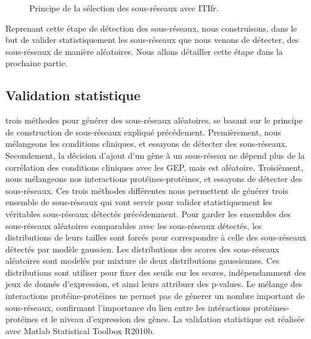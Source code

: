 			\begin{figure}
				\begin{center}
					\def\svgwidth{\columnwidth}
					\caption{Principe de la sélection des sous-réseaux avec \acl{ITIfr}.}
					\label{fig:Algorithme}
				\end{center}
			\end{figure}
			
			Reprenant cette étape de détection des sous-réseaux, nous construisons, dans le but de valider statistiquement les sous-réseaux que nous venons de détecter, des sous-réseaux de manière aléatoires.
			Nous allons détailler cette étape dans la prochaine partie.

		\subsection{\textcolor{green!60!black}{Validation statistique}}
			 trois méthodes pour générer des sous-réseaux aléatoires, se basant sur le principe de construction de sous-réseaux expliqué précédement.
			Premièrement, nous mélangeons les conditions cliniques, et essayons de détecter des sous-réseaux.
			Secondement, la décision d'ajout d'un gène à un sous-réseau ne dépend plus de la corrélation des conditions cliniques avec les \acs{GEP}, mais est aléatoire.
			Troisièment, nous mélangeons nos interactions protéines-protéines, et essayons de détecter des sous-réseaux.
			Ces trois méthodes différentes nous permettent de générer trois ensemble de sous-réseaux qui vont servir pour valider statistiquement les véritables sous-réseaux détectés précédemment.
			Pour garder les ensembles des sous-réseaux aléatoires comparables avec les sous-réseaux détectés, les distributions de leurs tailles sont forcés pour correspondre à celle des sous-réseaux détectés par modèle gaussien.
			Les distributions des scores des sous-réseaux aléatoires sont modelés par mixture de deux distributions gaussiennes.
			Ces distributions sont utiliser pour fixer des seuils sur les scores, indépendamment des jeux de donnés d'expression, et ainsi leurs attribuer des p-values.
			Le mélange des interactions protéine-protéines ne permet pas de génerer un nombre important de sous-réseaux, confirmant l'importance du lien entre les intéractions protéines-protéines et le niveau d'expression des gènes.
			La validation statistique est réalisée avec Matlab Statistical Toolbox R2010b.

